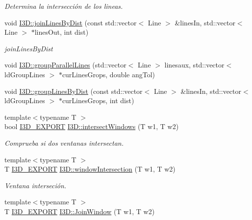 \begin{DoxyCompactItemize}
\begin{DoxyCompactList}\small\item\em Determina la intersección de los lineas. \end{DoxyCompactList}\item 
void \hyperlink{group___geometric_entities_gac6db25c8f17cca3b2fd2f737efda6a5a}{I3\+D\+::join\+Lines\+By\+Dist} (const std\+::vector$<$ Line $>$ \&lines\+In, std\+::vector$<$ Line $>$ $\ast$lines\+Out, int dist)
\begin{DoxyCompactList}\small\item\em join\+Lines\+By\+Dist \end{DoxyCompactList}\item 
void \hyperlink{group___geometric_entities_gaa8733cce0398776f35f9dcdbb1a3c933}{I3\+D\+::group\+Parallel\+Lines} (std\+::vector$<$ Line $>$ linesaux, std\+::vector$<$ ld\+Group\+Lines $>$ $\ast$cur\+Lines\+Grops, double ang\+Tol)
\item 
void \hyperlink{group___geometric_entities_gadffdd08b45284c20785b162ee959f11f}{I3\+D\+::group\+Lines\+By\+Dist} (const std\+::vector$<$ Line $>$ \&lines\+In, std\+::vector$<$ ld\+Group\+Lines $>$ $\ast$cur\+Lines\+Grops, int dist)
\item 
{\footnotesize template$<$typename T $>$ }\\bool \hyperlink{defs_8h_a83f373279ee1ca96b4003c673142ec1d}{I3\+D\+\_\+\+E\+X\+P\+O\+RT} \hyperlink{group___geometric_entities_ga49d19dd7415d32cba445301ef821d307}{I3\+D\+::intersect\+Windows} (T w1, T w2)
\begin{DoxyCompactList}\small\item\em Comprueba si dos ventanas intersectan. \end{DoxyCompactList}\item 
{\footnotesize template$<$typename T $>$ }\\T \hyperlink{defs_8h_a83f373279ee1ca96b4003c673142ec1d}{I3\+D\+\_\+\+E\+X\+P\+O\+RT} \hyperlink{group___geometric_entities_gaa929176ef49672b0bc0019c5fe58a017}{I3\+D\+::window\+Intersection} (T w1, T w2)
\begin{DoxyCompactList}\small\item\em Ventana interseción. \end{DoxyCompactList}\item 
{\footnotesize template$<$typename T $>$ }\\T \hyperlink{defs_8h_a83f373279ee1ca96b4003c673142ec1d}{I3\+D\+\_\+\+E\+X\+P\+O\+RT} \hyperlink{group___geometric_entities_gaf677fb79aab3cae623065eb14b719f3d}{I3\+D\+::\+Join\+Window} (T w1, T w2)

\end{DoxyCompactItemize}
